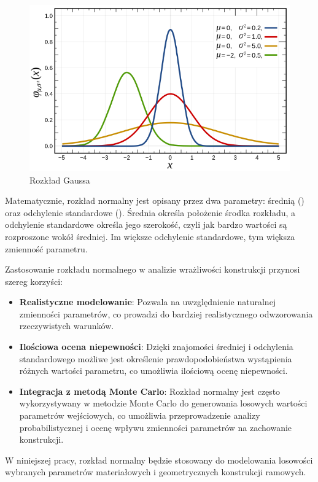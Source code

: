 \begin{figure}[H]
    \centering
    \includegraphics[scale=0.6]{images/Gauss}
    \caption{Rozkład Gaussa\cite{gauss}}
\end{figure}

Matematycznie, rozkład normalny jest opisany przez dwa parametry: średnią (\mu) oraz odchylenie standardowe (\sigma).
Średnia określa położenie środka rozkładu, a odchylenie standardowe określa jego szerokość, czyli jak bardzo wartości są rozproszone wokół średniej.
Im większe odchylenie standardowe, tym większa zmienność parametru\cite{gauss}.

Zastosowanie rozkładu normalnego w analizie wrażliwości konstrukcji przynosi szereg korzyści:

\begin{itemize}
    \item \textbf{Realistyczne modelowanie}: Pozwala na uwzględnienie naturalnej zmienności parametrów, co prowadzi do bardziej realistycznego odwzorowania rzeczywistych warunków.
    \item \textbf{Ilościowa ocena niepewności}: Dzięki znajomości średniej i odchylenia standardowego możliwe jest określenie prawdopodobieństwa wystąpienia różnych wartości parametru, co umożliwia ilościową ocenę niepewności.
    \item \textbf{Integracja z metodą Monte Carlo}: Rozkład normalny jest często wykorzystywany w metodzie Monte Carlo do generowania losowych wartości parametrów wejściowych, co umożliwia przeprowadzenie analizy probabilistycznej i ocenę wpływu zmienności parametrów na zachowanie konstrukcji.
\end{itemize}
W niniejszej pracy, rozkład normalny będzie stosowany do modelowania losowości wybranych parametrów materiałowych i geometrycznych konstrukcji ramowych.

